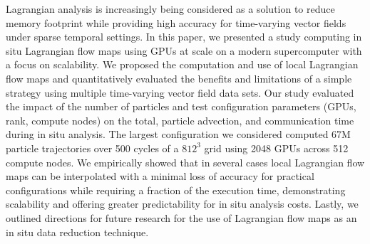 Lagrangian analysis is increasingly being considered as a solution to reduce memory footprint while providing high accuracy for time-varying vector fields under sparse temporal settings.
%
%
In this paper, we presented a study computing in situ Lagrangian flow maps using GPUs at scale on a modern supercomputer with a focus on scalability.
%
%
We proposed the computation and use of local Lagrangian flow maps and quantitatively evaluated the benefits and limitations of a simple strategy using multiple time-varying vector field data sets.
%
Our study evaluated the impact of the number of particles and test configuration parameters (GPUs, rank, compute nodes) on the total, particle advection, and communication time during in situ analysis.
%
The largest configuration we considered computed 67M particle trajectories over 500 cycles of a $812^{3}$ grid using 2048 GPUs across 512 compute nodes.
%
We empirically showed that in several cases local Lagrangian flow maps can be interpolated with a minimal loss of accuracy for practical configurations while requiring a fraction of the execution time, demonstrating scalability and offering greater predictability for in situ analysis costs.
%
Lastly, we outlined directions for future research for the use of Lagrangian flow maps as an in situ data reduction technique.
